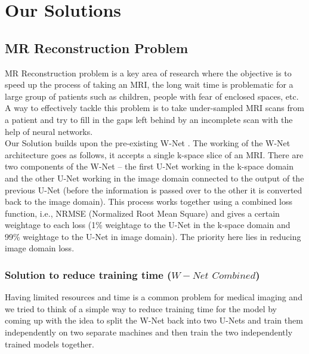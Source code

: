 
\chapter{Our Solutions}\label{ch:soln}
\ifpdf
    \graphicspath{{Chapter2/Chapter2Figs/PNG/}{Chapter2/Chapter2Figs/PDF/}{Chapter2/Chapter2Figs/}}
\else
    \graphicspath{{Chapter2/Chapter2Figs/EPS/}{Chapter2/Chapter2Figs/}}
\fi

\section{MR Reconstruction Problem}\label{sec:prob_1}

MR Reconstruction problem is a key area of research where the objective is to speed up the process of taking an MRI, the long wait time is problematic for a large group of patients such as children, people with fear of enclosed spaces, etc. A way to effectively tackle this problem is to take under-sampled MRI scans from a patient and try to fill in the gaps left behind by an incomplete scan with the help of neural networks.\\

Our Solution builds upon the pre-existing W-Net \cite{8919674}. The working of the W-Net architecture goes as follows, it accepts a single k-space slice of an MRI. There are two components of the W-Net -- the first U-Net working in the k-space domain and the other U-Net working in the image domain connected to the output of the previous U-Net (before the information is passed over to the other it is converted back to the image domain). This process works together using a combined loss function, i.e., NRMSE (Normalized Root Mean Square) and gives a certain weightage to each loss (1\% weightage to the U-Net in the k-space domain and 99\% weightage to the U-Net in image domain). The priority here lies in reducing image domain loss.\\

\subsection{Solution to reduce training time ($W-Net$ $Combined$)}

Having limited resources and time is a common problem for medical imaging and we tried to think of a simple way to reduce training time for the model by coming up with the idea to split the W-Net back into two U-Nets and train them independently on two separate machines and then train the two independently trained models together.\\

